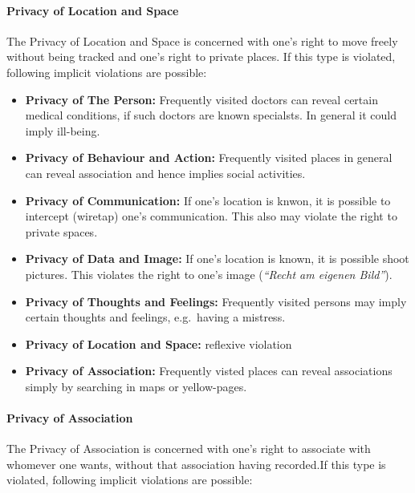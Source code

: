 \paragraph*{Privacy of Location and Space}

The Privacy of Location and Space is concerned with one's right to move
freely without being tracked and one's right to private places. If this
type is violated, following implicit violations are possible:

\begin{itemize}

\item
  \textbf{Privacy of The Person:} Frequently visited doctors can reveal
  certain medical conditions, if such doctors are known specialsts. In
  general it could imply ill-being.
\item
  \textbf{Privacy of Behaviour and Action:} Frequently visited places in
  general can reveal association and hence implies social activities.
\item
  \textbf{Privacy of Communication:} If one's location is knwon, it is
  possible to intercept (wiretap) one's communication. This also may
  violate the right to private spaces.
\item
  \textbf{Privacy of Data and Image:} If one's location is known, it is
  possible shoot pictures. This violates the right to one's image
  (\emph{``Recht am eigenen Bild''}).
\item
  \textbf{Privacy of Thoughts and Feelings:} Frequently visited persons
  may imply certain thoughts and feelings, e.g.~having a mistress.
\item
  \textbf{Privacy of Location and Space:} reflexive violation
\item
  \textbf{Privacy of Association:} Frequently visted places can reveal
  associations simply by searching in maps or yellow-pages.
\end{itemize}

\paragraph*{Privacy of Association}

The Privacy of Association is concerned with one's right to associate
with whomever one wants, without that association having recorded.If
this type is violated, following implicit violations are possible:

